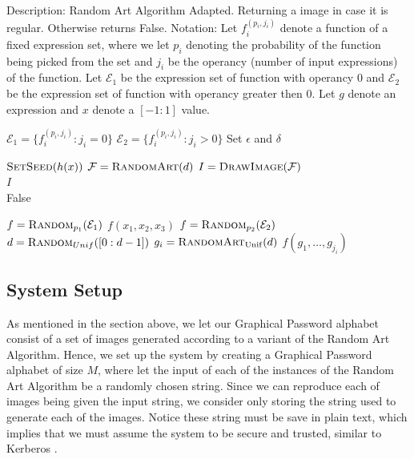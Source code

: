 \documentclass[11pt,a4paper]{article}
\theoremstyle{defn, nobreak=true}
\begin{document}
\begin{algorithm}
\caption{Description: Random Art Algorithm Adapted. Returning a image in case it is regular. Otherwise returns False. Notation: Let $f_i^{(p_i,j_i)}$ denote a function of a fixed expression set, where we let $p_i$ denoting the probability of the function being picked from the set and $j_i$ be the operancy (number of input expressions) of the function. Let $\mathcal{E}_1$ be the expression set of function with operancy $0$ and $\mathcal{E}_2$ be the expression set of function with operancy greater then $0$. Let $g$ denote an expression and $x$ denote a $\left[-1:1\right]$ value.
\label{alg:randart}}
\begin{algorithmic}[1] 

\State $\mathcal{E}_1=\{f_i^{(p_i,j_i)}: j_i=0\}$
\State $\mathcal{E}_2=\{f_i^{(p_i,j_i)}: j_i>0\}$ 
\State Set $\epsilon$ and $\delta$

\State $\textsc{SetSeed}(h(x))$
\State $\mathcal{F}=\textsc{RandomArt}(d)$
\State $I=\textsc{DrawImage}(\mathcal{F})$
 \\
\quad \Return $I$
\Else \\
\quad \Return False
\EndIf
\EndProcedure

\item 

\State $f=\textsc{Random}_{p_1}(\mathcal{E}_1)$
\Return $f(x_1,x_2,x_3)$
\Else
\State $f=\textsc{Random}_{p_2}(\mathcal{E}_2)$
\State $d=\textsc{Random}_{Unif}(\left[0:d-1\right])$
\State $g_i=\textsc{RandomArt}_{\mathrm{Unif}}(d)$
\EndFor
\EndIf
\Return $f(g_1,\dots,g_{j_i})$
\EndProcedure

\end{algorithmic}
\end{algorithm}

\subsection{System Setup} \label{subsec:create}

As mentioned in the section above, we let our Graphical Password alphabet consist of a set of images generated according to a variant of the Random Art Algorithm. Hence, we set up the system by creating a Graphical Password alphabet of size $M$, where let the input of each of the instances of the Random Art Algorithm be a randomly chosen string. Since we can reproduce each of images being given the input string, we consider only storing the string used to generate each of the images. Notice these string must be save in plain text, which implies that we must assume the system to be secure and trusted, similar to Kerberos \cite{Kerbyear}.
\end{document}
